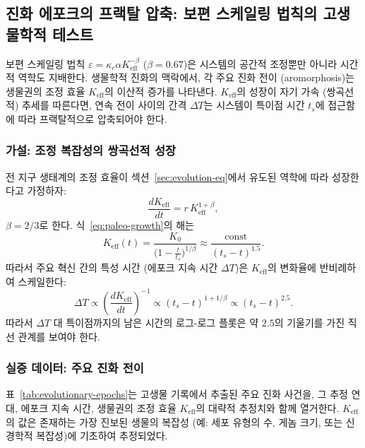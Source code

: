 \documentclass[12pt,a4paper]{article}
\theoremstyle{remark}
\begin{document}
	\subsection{진화 에포크의 프랙탈 압축: 보편 스케일링 법칙의 고생물학적 테스트}
	\label{subsec:paleo-scaling}
	
	보편 스케일링 법칙 \(\varepsilon = \kappa_c \alpha K_{\mathrm{eff}}^{-\beta}\) (\(\beta = 0.67\))은 시스템의 공간적 조정뿐만 아니라 시간적 역학도 지배한다. 생물학적 진화의 맥락에서, 각 주요 진화 전이 (aromorphosis)는 생물권의 조정 효율 \(K_{\mathrm{eff}}\)의 이산적 증가를 나타낸다. \(K_{\mathrm{eff}}\)의 성장이 자기 가속 (쌍곡선적) 추세를 따른다면, 연속 전이 사이의 간격 \(\Delta T\)는 시스템이 특이점 시간 \(t_s\)에 접근함에 따라 프랙탈적으로 압축되어야 한다.
	
	\subsubsection{가설: 조정 복잡성의 쌍곡선적 성장}
	
	전 지구 생태계의 조정 효율이 섹션~\ref{sec:evolution-eq}에서 유도된 역학에 따라 성장한다고 가정하자:
	\begin{equation}
		\frac{dK_{\mathrm{eff}}}{dt} = r \, K_{\mathrm{eff}}^{1+\beta},
		\label{eq:paleo-growth}
	\end{equation}
	\(\beta = 2/3\)로 한다. 식~\eqref{eq:paleo-growth}의 해는
	\begin{equation}
		K_{\mathrm{eff}}(t) = \frac{K_0}{\bigl(1 - \frac{t}{t_s}\bigr)^{1/\beta}} \approx \frac{\text{const}}{(t_s - t)^{1.5}}.
		\label{eq:paleo-keff}
	\end{equation}
	따라서 주요 혁신 간의 특성 시간 (에포크 지속 시간 \(\Delta T\))은 \(K_{\mathrm{eff}}\)의 변화율에 반비례하여 스케일한다:
	\begin{equation}
		\Delta T \propto \left( \frac{dK_{\mathrm{eff}}}{dt} \right)^{-1} \propto (t_s - t)^{1 + 1/\beta} \propto (t_s - t)^{2.5}.
		\label{eq:paleo-dT}
	\end{equation}
	따라서 \(\Delta T\) 대 특이점까지의 남은 시간의 로그-로그 플롯은 약 \(2.5\)의 기울기를 가진 직선 관계를 보여야 한다.
	
	\subsubsection{실증 데이터: 주요 진화 전이}
	
	표~\ref{tab:evolutionary-epochs}는 고생물 기록에서 추출된 주요 진화 사건을, 그 추정 연대, 에포크 지속 시간, 생물권의 조정 효율 \(K_{\mathrm{eff}}\)의 대략적 추정치와 함께 열거한다. \(K_{\mathrm{eff}}\)의 값은 존재하는 가장 진보된 생물의 복잡성 (예: 세포 유형의 수, 게놈 크기, 또는 신경학적 복잡성)에 기초하여 추정되었다.
	
\end{document}
